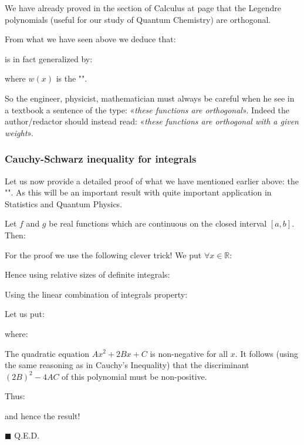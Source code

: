 	\begin{tcolorbox}[title=Remark,arc=10pt,breakable,drop lifted shadow,
  skin=enhanced,
  skin first is subskin of={enhancedfirst}{arc=10pt,no shadow},
  skin middle is subskin of={enhancedmiddle}{arc=10pt,no shadow},
  skin last is subskin of={enhancedlast}{drop lifted shadow}]
	We have already proved in the section of Calculus at page \pageref{legendre polynomials} that the Legendre polynomials (useful for our study of Quantum Chemistry) are orthogonal.
	\end{tcolorbox}
	From what we have seen above we deduce that:
	
	is in fact generalized by:
	
	where $w(x)$ is the "". 
	
	So the engineer, physicist, mathematician must always be careful when he see in a textbook a sentence of the type: «\textit{these functions are orthogonal}». Indeed the author/redactor should instead read: «\textit{these functions are orthogonal with a given weight}».
	
	\subsubsection{Cauchy-Schwarz inequality for integrals}\label{Cauchy-Schwarz inequality for integrals}
	Let us now provide a detailed proof of what we have mentioned earlier above: the 	"\label{Cauchy-Schwarz inequality for integrals}". As this will be an important result with quite important application in Statistics and Quantum Physics.
	
	\begin{theorem}
	Let $f$ and $g$ be real functions which are continuous on the closed interval $[a,b]$. Then:
	
	\end{theorem}
	\begin{dem}
	For the proof we use the following clever trick! We put $\forall x\in\mathbb{R}$:
	
	Hence using relative sizes of definite integrals:
	
	Using the linear combination of integrals property:
	
	Let us put:
	
	where:
	
	The quadratic equation $Ax^2+2Bx+C$ is non-negative for all $x$. It follows (using the same reasoning as in Cauchy's Inequality) that the discriminant $(2B)^2-4AC$ of this polynomial must be non-positive.
	
	Thus:
	
	and hence the result!
	\begin{flushright}
		$\blacksquare$  Q.E.D.
	\end{flushright}
	\end{dem}
	
